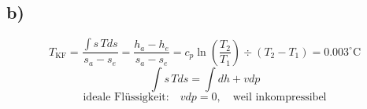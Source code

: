 

\subsection*{b)}
\[
T_{\text{KF}} = \frac{\int s \, T ds}{s_a - s_e} = \frac{h_a - h_e}{s_a - s_e} = c_p \ln \left( \frac{T_2}{T_1} \right) \div (T_2 - T_1) = 0.003^\circ \text{C}
\]
\[
\int s \, T ds = \int dh + v dp
\]
\[
\text{ideale Flüssigkeit:} \quad v dp = 0, \quad \text{weil inkompressibel}
\]